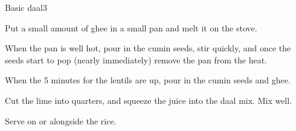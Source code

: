 \documentclass{article}
\begin{document}
\begin{recipe}{Basic daal}{3}
\begin{step}
\begin{stepdesc}
      \end{stepdesc}
    \end{step}
    \begin{step}
      \begin{ingrs}
      \end{ingrs}
      \begin{stepdesc}
        Put a small amount of ghee in a small pan and melt it on the stove.
      \end{stepdesc}
    \end{step}
    \begin{step}
      \begin{ingrs}
      \end{ingrs}
      \begin{stepdesc}
        When the pan is well hot, pour in the cumin seeds, stir quickly, and once the seeds start to pop (nearly immediately) remove the pan from the heat.
      \end{stepdesc}
    \end{step}
    \begin{step}
      \begin{ingrs}
      \end{ingrs}
      \begin{stepdesc}
        When the 5 minutes for the lentils are up, pour in the cumin seeds and ghee.
      \end{stepdesc}
    \end{step}
    \begin{step}
      \begin{ingrs}
      \end{ingrs}
      \begin{stepdesc}
        Cut the lime into quarters, and squeeze the juice into the daal mix. Mix well.
      \end{stepdesc}
    \end{step}
    \begin{step}
      \begin{ingrs}
      \end{ingrs}
      \begin{stepdesc}
        Serve on or alongside the rice.
      \end{stepdesc}
    \end{step}
  \end{recipe}
\end{document}
